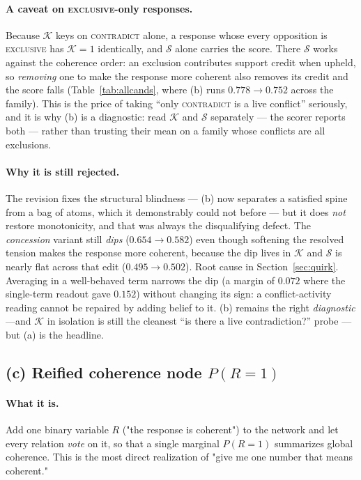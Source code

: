 \documentclass[11pt]{article}
\begin{document}
\paragraph{A caveat on \textsc{exclusive}-only responses.} Because $\mathcal K$ keys on
\textsc{contradict} alone, a response whose every opposition is \textsc{exclusive} has
$\mathcal K{=}1$ identically, and $\mathcal S$ alone carries the score. There $\mathcal S$
works against the coherence order: an exclusion contributes support credit when upheld, so
\emph{removing} one to make the response more coherent also removes its credit and the score
falls (Table~\ref{tab:allcands}, where (b) runs $0.778\to0.752$ across the family). This is
the price of taking ``only \textsc{contradict} is a live conflict'' seriously, and it is why
(b) is a diagnostic: read $\mathcal K$ and $\mathcal S$ separately --- the scorer reports both
--- rather than trusting their mean on a family whose conflicts are all exclusions.

\paragraph{Why it is still rejected.} The revision fixes the structural blindness --- (b) now
separates a satisfied spine from a bag of atoms, which it demonstrably could not before --- but
it does \emph{not} restore monotonicity, and that was always the disqualifying defect. The
\emph{concession} variant still \emph{dips} ($0.654\to0.582$) even though softening the
resolved tension makes the response more coherent, because the dip lives in $\mathcal K$ and
$\mathcal S$ is nearly flat across that edit ($0.495\to0.502$). Root cause in
Section~\ref{sec:quirk}. Averaging in a well-behaved term narrows the dip (a margin of $0.072$
where the single-term readout gave $0.152$) without changing its sign: a conflict-activity
reading cannot be repaired by adding belief to it. (b) remains the right \emph{diagnostic}
---and $\mathcal K$ in isolation is still the cleanest ``is there a live contradiction?''
probe --- but (a) is the headline.

\subsection{(c) Reified coherence node $P(R{=}1)$}
\label{sec:reified}

\paragraph{What it is.} Add one binary variable $R$ ("the response is coherent") to the
network and let every relation \emph{vote} on it, so that a single marginal $P(R{=}1)$
summarizes global coherence. This is the most direct realization of "give me one number
that means coherent."
\end{document}
